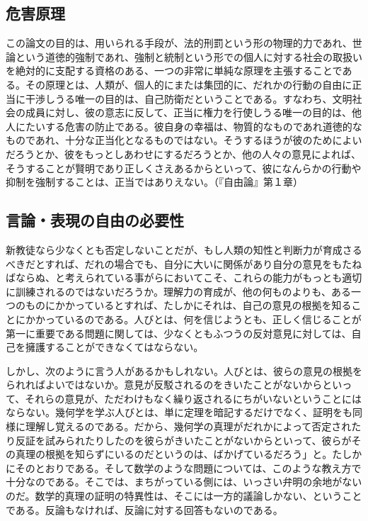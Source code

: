 \subsection{危害原理}



この論文の目的は、用いられる手段が、法的刑罰という形の物理的力であれ、世論という道徳的強制であれ、強制と統制という形での個人に対する社会の取扱いを絶対的に支配する資格のある、一つの非常に単純な原理を主張することである。その原理とは、人類が、個人的にまたは集団的に、だれかの行動の自由に正当に干渉しうる唯一の目的は、自己防衛だということである。すなわち、文明社会の成員に対し、彼の意志に反して、正当に権力を行使しうる唯一の目的は、他人にたいする危害の防止である。彼自身の幸福は、物質的なものであれ道徳的なものであれ、十分な正当化となるものではない。そうするほうが彼のためによいだろうとか、彼をもっとしあわせにするだろうとか、他の人々の意見によれば、そうすることが賢明であり正しくさえあるからといって、彼になんらかの行動や抑制を強制することは、正当ではありえない。（『自由論』第１章）


\subsection{言論・表現の自由の必要性}


新教徒なら少なくとも否定しないことだが、もし人類の知性と判断力が育成さるべきだとすれば、だれの場合でも、自分に大いに関係があり自分の意見をもたねばならぬ、と考えられている事がらにおいてこそ、これらの能力がもっとも適切に訓練されるのではないだろうか。理解力の育成が、他の何ものよりも、ある一つのものにかかっているとすれば、たしかにそれは、自己の意見の根拠を知ることにかかっているのである。人びとは、何を信じようとも、正しく信じることが第一に重要である問題に関しては、少なくともふつうの反対意見に対しては、自己を擁護することができなくてはならない。

しかし、次のように言う人があるかもしれない。人びとは、彼らの意見の根拠をられればよいではないか。意見が反駁されるのをきいたことがないからといって、それらの意見が、ただわけもなく繰り返されるにちがいないということにはならない。幾何学を学ぶ人びとは、単に定理を暗記するだけでなく、証明をも同様に理解し覚えるのである。だから、幾何学の真理がだれかによって否定されたり反証を試みられたりしたのを彼らがきいたことがないからといって、彼らがその真理の根拠を知らずにいるのだというのは、ばかげているだろう」と。たしかにそのとおりである。そして数学のような問題については、このような教え方で十分なのである。そこでは、まちがっている側には、いっさい弁明の余地がないのだ。数学的真理の証明の特異性は、そこには一方的議論しかない、ということである。反論もなければ、反論に対する回答もないのである。


